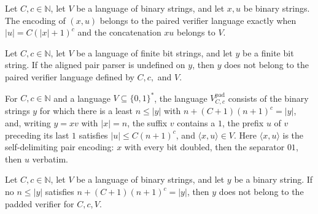 \begin{lemma}
\label{Complexity.pairedVerifier_pair}
\leanok
{}
Let $C,c\in\mathbb{N}$, let $V$ be a language of binary strings, and let $x,u$ be binary
strings. The encoding of $(x,u)$ belongs to the paired verifier language exactly when
$|u|=C(|x|+1)^c$ and the concatenation $xu$ belongs to $V$.
\end{lemma}

\begin{lemma}
\label{Complexity.pairedVerifier_malformed}
\leanok
{}
Let $C,c\in\mathbb{N}$, let $V$ be a language of finite bit strings, and let $y$ be a
finite bit string. If the aligned pair parser is undefined on $y$, then $y$ does not
belong to the paired verifier language defined by $C,c,$ and $V$.
\end{lemma}

\begin{definition}
\label{Complexity.paddedVerifier}
\leanok
{}
For $C, c \in \mathbb{N}$ and a language $V \subseteq \{0,1\}^{*}$, the language
$V^{\mathrm{pad}}_{C,c}$ consists of the binary strings $y$ for which there is a
least $n \le |y|$ with $n + (C+1)(n+1)^c = |y|$, and, writing $y = xv$ with
$|x| = n$, the suffix $v$ contains a $1$, the prefix $u$ of $v$ preceding its last
$1$ satisfies $|u| \le C(n+1)^c$, and $\langle x, u\rangle \in V$. Here
$\langle x, u\rangle$ is the self-delimiting pair encoding: $x$ with every bit
doubled, then the separator $01$, then $u$ verbatim.
\end{definition}

\begin{lemma}
\label{Complexity.paddedVerifier_no_split}
\leanok
{}
Let $C,c\in\mathbb{N}$, let $V$ be a language of binary strings, and let $y$ be a binary
string. If no $n\le |y|$ satisfies $n+(C+1)(n+1)^c=|y|$, then $y$ does not belong to the
padded verifier for $C,c,V$.
\end{lemma}

